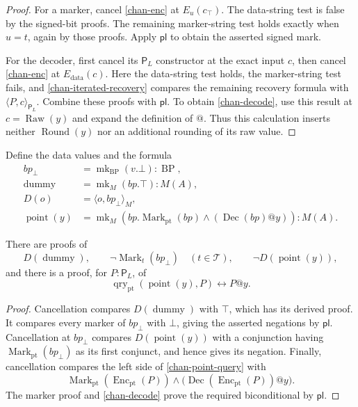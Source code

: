 \begin{proof}
For a marker, cancel \eqref{chan-enc} at $E_u(c_\top)$.  The data-string
test is false by the signed-bit proofs.  The remaining marker-string
test holds exactly when $u=t$, again by those proofs.  Apply
$\mathsf{pl}$ to obtain the asserted signed mark.

For the decoder, first cancel its $\mathsf P_L$ constructor at the exact
input $c$, then cancel \eqref{chan-enc} at
$E_{\mathrm{data}}(c)$.  Here the data-string test holds, the
marker-string test fails, and \eqref{chan-iterated-recovery} compares the
remaining recovery formula with $\langle P,c\rangle_{\mathsf P_L}$.
Combine these proofs with $\mathsf{pl}$.  To obtain \eqref{chan-decode},
use this result at $c=\operatorname{Raw}(y)$ and expand the definition of
$@$.  Thus this calculation inserts neither
$\operatorname{Round}(y)$ nor an additional rounding of its raw value.
\end{proof}

Define the data values and the formula
\begin{equation}
\begin{aligned}
 bp_\bot&=\operatorname{mk}_{\operatorname{BP}}(v.\bot)
                       :\operatorname{BP},\\
 \operatorname{dummy}&=\operatorname{mk}_M(bp.\top):M(A),\\
 D(o)&=\langle o,bp_\bot\rangle_M,\\
 \operatorname{point}(y)
   &=\operatorname{mk}_M
       (bp.\operatorname{Mark}_{\operatorname{pt}}(bp)
                   \land(\operatorname{Dec}(bp)@y)):M(A).
\end{aligned}
\label{chan-point}
\end{equation}

\begin{lemma}
\label{chan-point-laws}
There are proofs of
\[
 D(\operatorname{dummy}),\qquad
 \neg\operatorname{Mark}_t(bp_\bot)\quad(t\in\mathcal T),\qquad
 \neg D(\operatorname{point}(y)),
\]
and there is a proof, for $P:\mathsf P_L$, of
\begin{equation}
 \operatorname{qry}_{\operatorname{pt}}(\operatorname{point}(y),P)
                  \leftrightarrow P@y.
\label{chan-point-query}
\end{equation}
\end{lemma}

\begin{proof}
Cancellation compares $D(\operatorname{dummy})$ with $\top$, which has
its derived proof.  It compares every marker of $bp_\bot$ with $\bot$,
giving the asserted negations by $\mathsf{pl}$.  Cancellation at
$bp_\bot$ compares $D(\operatorname{point}(y))$ with a conjunction
having $\operatorname{Mark}_{\operatorname{pt}}(bp_\bot)$ as its first
conjunct, and hence gives its negation.  Finally, cancellation compares
the left side of \eqref{chan-point-query} with
\[
 \operatorname{Mark}_{\operatorname{pt}}
       (\operatorname{Enc}_{\operatorname{pt}}(P))
 \land
 \bigl(\operatorname{Dec}(\operatorname{Enc}_{\operatorname{pt}}(P))@y\bigr).
\]
The marker proof and \eqref{chan-decode} prove the required
biconditional by $\mathsf{pl}$.
\end{proof}


